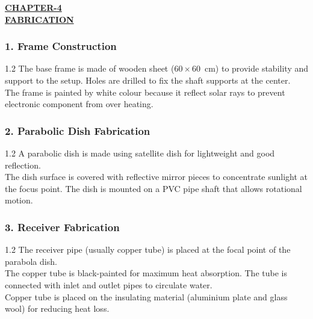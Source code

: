 \begin{center}
  {\fontsize{15}{18}\selectfont \bfseries \textcolor{red!80!black}{\underline{CHAPTER-4}}}\\[2mm]
  {\fontsize{16}{20}\selectfont \bfseries \textcolor{red!80!black}{\underline{FABRICATION}}}\\[5mm]
\end{center}

\subsubsection*{1. Frame Construction}
\noindent
\begin{spacing}{1.2}
{\fontsize{10.2}{14.5}\selectfont
The base frame is made of wooden sheet ($60 \times 60$~cm) to provide stability and support to the setup. Holes are drilled to fix the shaft supports at the center.\\[2.5mm]
The frame is painted by white colour because it reflect solar rays to prevent electronic component from over heating.
}
\end{spacing}

\vspace{4mm}
\subsubsection*{2. Parabolic Dish Fabrication}
\noindent
\begin{spacing}{1.2}
{\fontsize{10.2}{14.5}\selectfont
A parabolic dish is made using satellite dish for lightweight and good reflection.\\[2.5mm]
The dish surface is covered with reflective mirror pieces to concentrate sunlight at the focus point. The dish is mounted on a PVC pipe shaft that allows rotational motion.
}
\end{spacing}

\vspace{4mm}
\subsubsection*{3. Receiver Fabrication}
\noindent
\begin{spacing}{1.2}
{\fontsize{10.2}{14.5}\selectfont
The receiver pipe (usually copper tube) is placed at the focal point of the parabola dish.\\[2.5mm]
The copper tube is black-painted for maximum heat absorption. The tube is connected with inlet and outlet pipes to circulate water.\\[2.5mm]
Copper tube is placed on the insulating material (aluminium plate and glass wool) for reducing heat loss.
}
\end{spacing}

